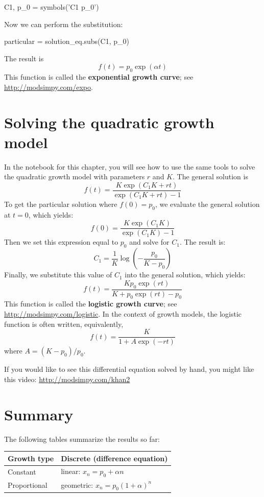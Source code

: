 \documentclass[12pt]{book}
\theoremstyle{exercise}
\begin{document}
\begin{python}
C1, p_0 = symbols('C1 p_0')
\end{python}

Now we can perform the substitution:

\begin{python}
particular = solution_eq.subs(C1, p_0)
\end{python}

The result is 
%
\[ f{\left (t \right )} = p_{0} \exp(\alpha t) \]
%
This function is called the {\bf exponential growth curve}; see \url{http://modsimpy.com/expo}.



\section{Solving the quadratic growth model}

In the notebook for this chapter, you will see how to use the same tools to solve the quadratic growth model with parameters $r$ and $K$.  The general solution is
%
\[ f{\left (t \right )} = \frac{K \exp(C_{1} K + r t)}{\exp(C_{1} K + r t) - 1} \]
%
To get the particular solution where $f(0) = p_0$, we evaluate the general solution at $t=0$, which yields:
%
\[ f(0) = \frac{K \exp(C_{1} K)}{\exp(C_{1} K) - 1} \]
%
Then we set this expression equal to $p_0$ and solve for $C_1$.  The result is:
%
\[ C_1 = \frac{1}{K} \log{\left (- \frac{p_{0}}{K - p_{0}} \right )} \]
%
Finally, we substitute this value of $C_1$ into the general solution, which yields:
%
\[ f(t) = \frac{K p_{0} \exp(r t)}{K + p_{0} \exp(r t) - p_{0}} \]
%
This function is called the {\bf logistic growth curve}; see \url{http://modsimpy.com/logistic}.  In the context of growth models, the logistic function is often written, equivalently,
%
\[ f(t) = \frac{K}{1 + A \exp(-rt)} \]
%
where $A = (K - p_0) / p_0$.

If you would like to see this differential equation solved by hand, you might like this video: \url{http://modsimpy.com/khan2}


\section{Summary}

The following tables summarize the results so far:

\begin{tabular}{l|l} 
\hline
Growth type         & Discrete (difference equation) \\ 
\hline 
Constant & linear: $x_n = p_0 + \alpha n$  \\ 
 
Proportional & geometric: $x_n = p_0(1+\alpha)^n$  \\ 

\end{tabular} 
\end{document}
